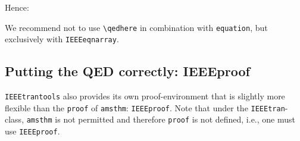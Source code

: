 \documentclass[a4paper,11pt]{article}
\begin{document}
Hence:
\begin{whitebox}
  \centering
  We recommend not to use \verb+\qedhere+ in combination with
  \verb+equation+, but exclusively with \verb+IEEEeqnarray+.
\end{whitebox}


\subsection{Putting the QED correctly: IEEEproof}
\label{sec:putting-qed-right2}

%
\verb+IEEEtrantools+ also provides its own proof-environment that is
slightly more flexible than the \verb+proof+ of \verb+amsthm+:
\verb+IEEEproof+. Note that under the \verb+IEEEtran+-class,
\verb+amsthm+ is not permitted and therefore \verb+proof+ is not
defined, i.e., one must use \verb+IEEEproof+.
\end{document}
